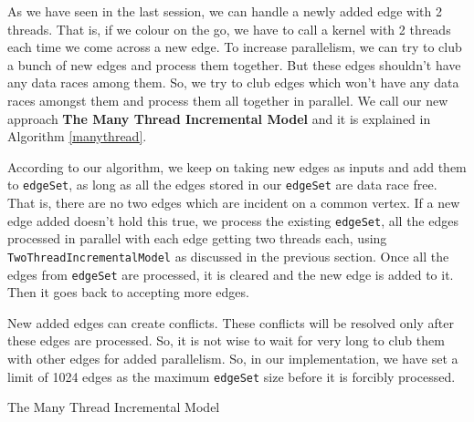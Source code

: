 \documentclass[MTech]{iitmdiss}
\makeatletter
\def\BState{\State\hskip-\ALG@thistlm}
\makeatother
\begin{document}
As we have seen in the last session, we can handle a newly added edge with 2 threads. That is, if we colour on the go, we have to call a kernel with 2 threads each time we come across a new edge. To increase parallelism, we can try to club a bunch of new edges and process them together. But these edges shouldn't have any data races among them. So, we try to club edges which won't have any data races amongst them and process them all together in parallel. We call our new approach \textbf{The Many Thread Incremental Model} and it is explained in Algorithm \ref{manythread}.

According to our algorithm, we keep on taking new edges as inputs and add them to \verb+edgeSet+, as long as all the edges stored in our \verb+edgeSet+ are data race free. That is, there are no two edges which are incident on a common vertex. If a new edge added doesn't hold this true, we process the existing \verb+edgeSet+, all the edges processed in parallel with each edge getting two threads each, using \verb+TwoThreadIncrementalModel+ as discussed in the previous section. Once all the edges from \verb+edgeSet+ are processed, it is cleared and the new edge is added to it. Then it goes back to accepting more edges. 

New added edges can create conflicts. These conflicts will be resolved only after these edges are processed. So, it is not wise to wait for very long to club them with other edges for added parallelism. So, in our implementation, we have set a limit of 1024 edges as the maximum \verb+edgeSet+ size before it is forcibly processed.

\begin{algorithm}
\caption{The Many Thread Incremental Model}\label{manythread}
\end{algorithm}
\end{document}
